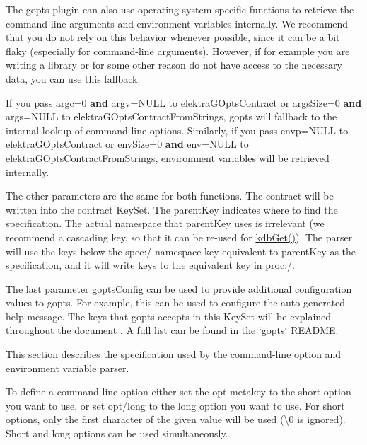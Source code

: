 The {\ttfamily gopts} plugin can also use operating system specific functions to retrieve the command-\/line arguments and environment variables internally. We recommend that you do not rely on this behavior whenever possible, since it can be a bit flaky (especially for command-\/line arguments). However, if for example you are writing a library or for some other reason do not have access to the necessary data, you can use this fallback.

If you pass {\ttfamily argc=0} {\bfseries and} {\ttfamily argv=N\+U\+LL} to {\ttfamily elektra\+G\+Opts\+Contract} or {\ttfamily args\+Size=0} {\bfseries and} {\ttfamily args=N\+U\+LL} to {\ttfamily elektra\+G\+Opts\+Contract\+From\+Strings}, {\ttfamily gopts} will fallback to the internal lookup of command-\/line options. Similarly, if you pass {\ttfamily envp=N\+U\+LL} to {\ttfamily elektra\+G\+Opts\+Contract} or {\ttfamily env\+Size=0} {\bfseries and} {\ttfamily env=N\+U\+LL} to {\ttfamily elektra\+G\+Opts\+Contract\+From\+Strings}, environment variables will be retrieved internally.

The other parameters are the same for both functions. The contract will be written into the {\ttfamily contract} Key\+Set. The {\ttfamily parent\+Key} indicates where to find the specification. The actual namespace that {\ttfamily parent\+Key} uses is irrelevant (we recommend a cascading key, so that it can be re-\/used for {\ttfamily \hyperlink{group__kdb_ga28e385fd9cb7ccfe0b2f1ed2f62453a1}{kdb\+Get()}}). The parser will use the keys below the {\ttfamily spec\+:/} namespace key equivalent to {\ttfamily parent\+Key} as the specification, and it will write keys to the equivalent key in {\ttfamily proc\+:/}.

The last parameter {\ttfamily gopts\+Config} can be used to provide additional configuration values to {\ttfamily gopts}. For example, this can be used to configure the auto-\/generated help message. The keys that {\ttfamily gopts} accepts in this Key\+Set will be explained throughout the document . A full list can be found in the \hyperlink{autotoc_md244_src_plugins_gopts_README_md}{`gopts` R\+E\+A\+D\+ME}.

This section describes the specification used by the command-\/line option and environment variable parser.

To define a command-\/line option either set the {\ttfamily opt} metakey to the short option you want to use, or set {\ttfamily opt/long} to the long option you want to use. For short options, only the first character of the given value will be used (\textquotesingle{}\textbackslash{}0\textquotesingle{} is ignored). Short and long options can be used simultaneously.


